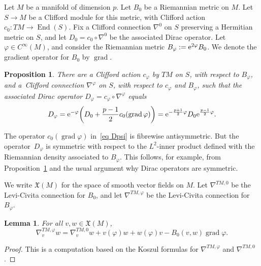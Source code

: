 \documentclass[10pt,a4paper]{amsart}
\numberwithin{equation}{section}
\newtheorem{Lemma}[Theorem]{Lemma}
\newtheorem{Proposition}[Theorem]{Proposition}
 { \theoremstyle{definition}
\newtheorem{Definition}[Theorem]{Definition}
\newtheorem{Note}[Theorem]{Note}
\newtheorem{Example}[Theorem]{Example}
\newtheorem{Remark}[Theorem]{Remark} }
\DeclareMathOperator{\grad}{grad}
\DeclareMathOperator{\End}{End}
\newcommand{\XX}{\mathfrak{X}}
\begin{document}
Let $M$ be a manifold of dimension $p$. Let $B_0$ be a Riemannian metric on $M$. Let $S \to M$ be a Clifford module for this metric, with Clifford action $c_0\colon TM \to \End(S)$. Fix a Clifford connection $\nabla^0$ on $S$ preserving a Hermitian metric on $S$, and let $D_0 = c_0\circ \nabla^0$ be the associated Dirac operator. Let $\varphi \in C^{\infty}(M)$, and consider the Riemannian metric $B_{\varphi} := {\rm e}^{2\varphi}B_0$. We denote the gradient operator for $B_0$ by $\grad$.
\begin{Proposition}\label{prop Dirac psi}
There are a Clifford action $c_{\varphi}$ by $TM$ on $S$, with respect to $B_{\varphi}$, and a~Clifford connection $\nabla^{\varphi}$ on $S$, with respect to $c_{\varphi}$ and $B_{\varphi}$, such that the associated Dirac operator $D_{\varphi} = c_{\varphi} \circ \nabla^{\varphi}$ equals
\begin{equation} \label{eq Dpsi}
D_{\varphi} = {\rm e}^{-\varphi}\bigg( D_0 + \frac{p-1}{2} c_0(\grad\varphi) \bigg) = {\rm e}^{-\frac{p+1}{2}\varphi} D_0 {\rm e}^{\frac{p-1}{2}\varphi}.
\end{equation}
\end{Proposition}
\begin{Remark}
The operator $c_0(\grad\varphi)$ in~\eqref{eq Dpsi} is fibrewise antisymmetric. But the operator~$D_{\varphi}$ is symmetric with respect to the $L^2$-inner product defined with the Riemannian density associated to $B_{\varphi}$. This follows, for example, from Proposition~\ref{prop Dirac psi} and the usual argument why Dirac operators are symmetric.
\end{Remark}

We write $\XX(M)$ for the space of smooth vector fields on $M$.
Let $\nabla^{TM, 0}$ be the Levi-Civita connection for $B_0$, and let $\nabla^{TM, \varphi}$ be the Levi-Civita connection for $B_{\varphi}$.
\begin{Lemma}\label{lem LC psi}
For all $v,w \in \XX(M)$,
\[
\nabla^{TM, \varphi}_v w = \nabla^{TM, 0}_v w + v(\varphi) w + w(\varphi)v -B_0(v,w)\grad \varphi.
\]
\end{Lemma}
\begin{proof}
This is a computation based on the
Koszul formulas for $\nabla^{TM, \varphi}$ and $\nabla^{TM, 0}$.
\end{proof}
\end{document}
